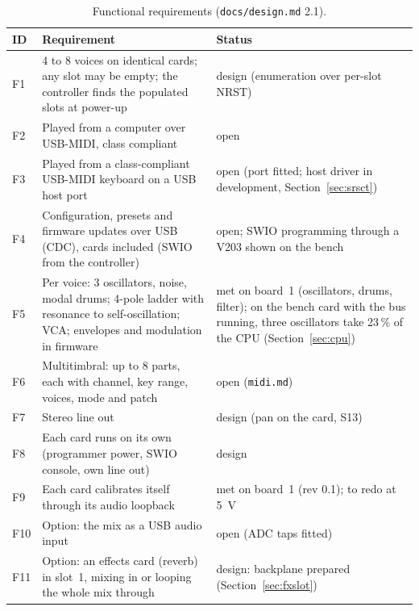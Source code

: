 \documentclass[11pt,a4paper]{article}
\newcommand{\file}[1]{\texttt{#1}}
\begin{document}
\begin{table}[htbp]
\centering\small
\caption{Functional requirements (\file{docs/design.md} 2.1).}\label{tab:reqf}
\begin{tabularx}{\textwidth}{@{}l X >{\raggedright\arraybackslash}p{4.3cm}@{}}
\toprule
ID & Requirement & Status \\
\midrule
F1 & 4 to 8 voices on identical cards; any slot may be empty; the controller finds the populated slots at power-up
  & design (enumeration over per-slot NRST) \\
F2 & Played from a computer over USB-MIDI, class compliant & open \\
F3 & Played from a class-compliant USB-MIDI keyboard on a USB host port & open (port fitted; host driver in development, Section~\ref{sec:srsct}) \\
F4 & Configuration, presets and firmware updates over USB (CDC), cards included (SWIO from the controller)
  & open; SWIO programming through a V203 shown on the bench \\
F5 & Per voice: 3 oscillators, noise, modal drums; 4-pole ladder with resonance to self-oscillation; VCA; envelopes
  and modulation in firmware & met on board~1 (oscillators, drums, filter); on the bench card with the bus running,
  three oscillators take 23\,\% of the CPU (Section~\ref{sec:cpu}) \\
F6 & Multitimbral: up to 8 parts, each with channel, key range, voices, mode and patch & open (\file{midi.md}) \\
F7 & Stereo line out & design (pan on the card, S13) \\
F8 & Each card runs on its own (programmer power, SWIO console, own line out) & design \\
F9 & Each card calibrates itself through its audio loopback & met on board~1 (rev 0.1); to redo at \SI{5}{V} \\
F10 & Option: the mix as a USB audio input & open (ADC taps fitted) \\
F11 & Option: an effects card (reverb) in slot~1, mixing in or looping the whole mix through & design: backplane
  prepared
  (Section~\ref{sec:fxslot}) \\
\bottomrule
\end{tabularx}
\end{table}
\end{document}
